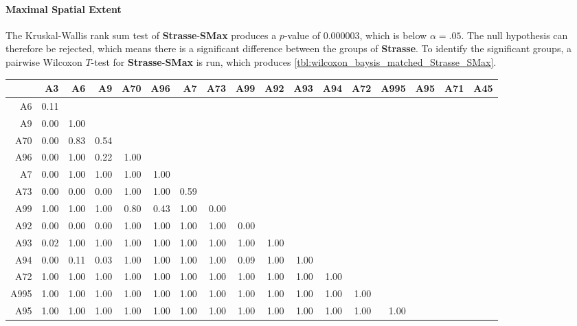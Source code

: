 \paragraph{Maximal Spatial Extent}
The Kruskal-Wallis rank sum test of \textbf{Strasse}-\textbf{SMax} produces a $p$-value of 0.000003, which is below $\alpha=.05$. The null hypothesis can therefore be rejected, which means there is a significant difference between the groups of \textbf{Strasse}. To identify the significant groups, a pairwise Wilcoxon $T$-test for \textbf{Strasse}-\textbf{SMax} is run, which produces \autoref{tbl:wilcoxon_baysis_matched_Strasse_SMax}.
\begin{table}[ht]
	\tiny
	\setlength{\tabcolsep}{4pt}
	\centering
	\begin{tabular}{rrrrrrrrrrrrrrrrr}
		\toprule
				& A3   & A6   & A9   & A70  & A96  & A7   & A73   & A99 & A92 & A93 & A94 & A72 & A995 & A95 & A71 & A45 \\ 
		\midrule
		A6 		& 0.11 &  &  &  &  &  &  &  &  &  &  &  &  &  &  &  \\ 
		A9 		& 0.00 & 1.00 &  &  &  &  &  &  &  &  &  &  &  &  &  &  \\ 
		A70 	& 0.00 & 0.83 & 0.54 &  &  &  &  &  &  &  &  &  &  &  &  &  \\ 
		A96 	& 0.00 & 1.00 & 0.22 & 1.00 &  &  &  &  &  &  &  &  &  &  &  &  \\ 
		A7 		& 0.00 & 1.00 & 1.00 & 1.00 & 1.00 &  &  &  &  &  &  &  &  &  &  &  \\ 
		A73 	& 0.00 & 0.00 & 0.00 & 1.00 & 1.00 & 0.59 &  &  &  &  &  &  &  &  &  &  \\ 
		A99 	& 1.00 & 1.00 & 1.00 & 0.80 & 0.43 & 1.00 & 0.00 &  &  &  &  &  &  &  &  &  \\ 
		A92 	& 0.00 & 0.00 & 0.00 & 1.00 & 1.00 & 1.00 & 1.00 & 0.00 &  &  &  &  &  &  &  &  \\ 
		A93 	& 0.02 & 1.00 & 1.00 & 1.00 & 1.00 & 1.00 & 1.00 & 1.00 & 1.00 &  &  &  &  &  &  &  \\ 
		A94 	& 0.00 & 0.11 & 0.03 & 1.00 & 1.00 & 1.00 & 1.00 & 0.09 & 1.00 & 1.00 &  &  &  &  &  &  \\ 
		A72 	& 1.00 & 1.00 & 1.00 & 1.00 & 1.00 & 1.00 & 1.00 & 1.00 & 1.00 & 1.00 & 1.00 &  &  &  &  &  \\ 
		A995 	& 1.00 & 1.00 & 1.00 & 1.00 & 1.00 & 1.00 & 1.00 & 1.00 & 1.00 & 1.00 & 1.00 & 1.00 &  &  &  &  \\ 
		A95 	& 1.00 & 1.00 & 1.00 & 1.00 & 1.00 & 1.00 & 1.00 & 1.00 & 1.00 & 1.00 & 1.00 & 1.00 & 1.00 &  &  &  \\ 

\end{tabular}
\end{table}
